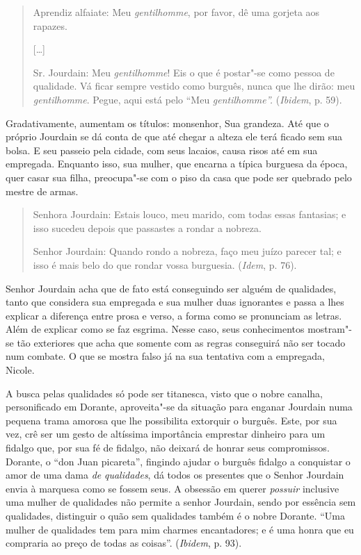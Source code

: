 \begin{quote}
Aprendiz alfaiate: Meu \emph{gentilhomme}, por favor, dê uma gorjeta aos
rapazes.

[\ldots{}]

Sr. Jourdain: Meu \emph{gentilhomme}! Eis o que é postar"-se como pessoa
de qualidade. Vá ficar sempre vestido como burguês, nunca que lhe dirão:
meu \emph{gentilhomme}. Pegue, aqui está pelo ``Meu
\emph{gentilhomme''.} (\emph{Ibidem}, p. 59).
\end{quote}

Gradativamente, aumentam os títulos: monsenhor, Sua grandeza. Até que o
próprio Jourdain se dá conta de que até chegar a alteza ele terá ficado
sem sua bolsa. E seu passeio pela cidade, com seus lacaios, causa risos
até em sua empregada. Enquanto isso, sua mulher, que encarna a típica
burguesa da época, quer casar sua filha, preocupa"-se com o piso da casa
que pode ser quebrado pelo mestre de armas.

\begin{quote}
Senhora Jourdain: Estais louco, meu marido, com todas essas fantasias; e
isso sucedeu depois que passastes a rondar a nobreza.

Senhor Jourdain: Quando rondo a nobreza, faço meu juízo parecer tal; e
isso é mais belo do que rondar vossa burguesia. (\emph{Idem}, p. 76).
\end{quote}

Senhor Jourdain acha que de fato está conseguindo ser alguém de
qualidades, tanto que considera sua empregada e sua mulher duas
ignorantes e passa a lhes explicar a diferença entre prosa e verso, a
forma como se pronunciam as letras. Além de explicar como se faz
esgrima. Nesse caso, seus conhecimentos mostram"-se tão exteriores que
acha que somente com as regras conseguirá não ser tocado num combate. O
que se mostra falso já na sua tentativa com a empregada, Nicole.

A busca pelas qualidades só pode ser titanesca, visto que o nobre
canalha, personificado em Dorante, aproveita"-se da situação para enganar
Jourdain numa pequena trama amorosa que lhe possibilita extorquir o
burguês. Este, por sua vez, crê ser um gesto de altíssima importância
emprestar dinheiro para um fidalgo que, por sua fé de fidalgo, não
deixará de honrar seus compromissos. Dorante, o ``don Juan picareta'',
fingindo ajudar o burguês fidalgo a conquistar o amor de uma dama
\emph{de} \emph{qualidades}, dá todos os presentes que o Senhor Jourdain
envia à marquesa como se fossem seus. A obsessão em querer
\emph{possuir} inclusive uma mulher de qualidades não permite a senhor
Jourdain, sendo por essência sem qualidades, distinguir o quão sem
qualidades também é o nobre Dorante. ``Uma mulher de qualidades tem para
mim charmes encantadores; e é uma honra que eu compraria ao preço de
todas as coisas''. (\emph{Ibidem}, p. 93).

